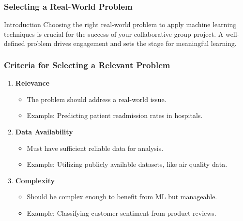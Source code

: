 \documentclass[aspectratio=169]{beamer}
\begin{document}
\begin{frame}[fragile]
    \frametitle{Selecting a Real-World Problem}
    \begin{block}{Introduction}
        Choosing the right real-world problem to apply machine learning techniques is crucial for the success of your collaborative group project.
        A well-defined problem drives engagement and sets the stage for meaningful learning.
    \end{block}
\end{frame}

\begin{frame}[fragile]
    \frametitle{Criteria for Selecting a Relevant Problem}
    \begin{enumerate}
        \item \textbf{Relevance}
            \begin{itemize}
                \item The problem should address a real-world issue.
                \item Example: Predicting patient readmission rates in hospitals.
            \end{itemize}
        \item \textbf{Data Availability}
            \begin{itemize}
                \item Must have sufficient reliable data for analysis.
                \item Example: Utilizing publicly available datasets, like air quality data.
            \end{itemize}
        \item \textbf{Complexity}
            \begin{itemize}
                \item Should be complex enough to benefit from ML but manageable.
                \item Example: Classifying customer sentiment from product reviews.
            \end{itemize}
    \end{enumerate}
\end{frame}
\end{document}
